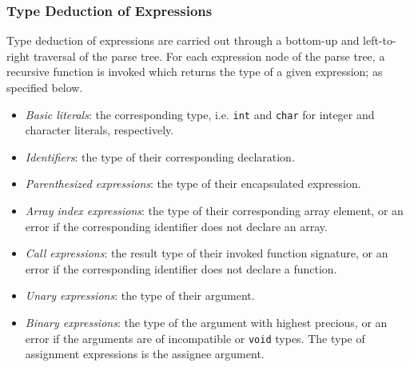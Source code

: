 \subsubsection{Type Deduction of Expressions}

Type deduction of expressions are carried out through a bottom-up and left-to-right traversal of the parse tree. For each expression node of the parse tree, a recursive function is invoked which returns the type of a given expression; as specified below.

\begin{itemize}
	\item \textit{Basic literals}: the corresponding type, i.e. \texttt{int} and \texttt{char} for integer and character literals, respectively.
	\item \textit{Identifiers}: the type of their corresponding declaration.
	\item \textit{Parenthesized expressions}: the type of their encapsulated expression.
	\item \textit{Array index expressions}: the type of their corresponding array element, or an error if the corresponding identifier does not declare an array.
	\item \textit{Call expressions}: the result type of their invoked function signature, or an error if the corresponding identifier does not declare a function.
	\item \textit{Unary expressions}: the type of their argument.
	\item \textit{Binary expressions}: the type of the argument with highest precious, or an error if the arguments are of incompatible or \texttt{void} types. The type of assignment expressions is the assignee argument.
\end{itemize}
